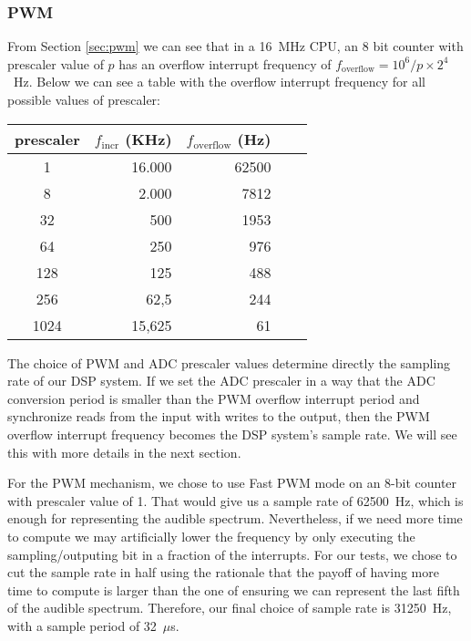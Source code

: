 

\subsubsection{PWM}
\label{sec:proc-pwm}

From Section \ref{sec:pwm} we can see that in a 16~MHz CPU, an 8 bit counter with prescaler value of $p$ has 
an overflow interrupt frequency of $f_\text{overflow}=10^6/p \times 2^4$~Hz.
Below we can see a table with the overflow interrupt frequency for all possible values of
prescaler:

\begin{center}
\begin{tabular}{crrrr}
\toprule
\toprule
\footnotesize{prescaler} &
\footnotesize{$f_\text{incr}$ (KHz)} &
\footnotesize{$f_\text{overflow}$ (Hz)}  \\
\midrule
1 & 16.000 & 62500 \\
8 & 2.000 & 7812 \\
32 & 500 & 1953 \\
64 & 250 & 976 \\
128 & 125 & 488 \\
256 & 62,5 & 244 \\
1024 & 15,625 & 61 \\
\bottomrule
\end{tabular}
\end{center}

The choice of PWM and ADC prescaler values determine directly the sampling
rate of our DSP system. If we set the ADC prescaler in a way that the ADC
conversion period is smaller than the PWM overflow interrupt period and synchronize
reads from the input with writes to the output, then
the PWM overflow interrupt frequency becomes the DSP system's sample rate. We
will see this with more details in the next section.

For the PWM mechanism, we chose to use Fast PWM mode on
an 8-bit counter with prescaler value of 1. That would give us a sample rate of
62500~Hz, which is enough for representing the audible spectrum. Nevertheless,
if we need more time to compute we may artificially lower the frequency by
only executing the sampling/outputing bit in a fraction of the interrupts. For
our tests, we chose to cut the sample rate in half using the rationale that
the payoff of having more time to compute is larger than the one of ensuring
we can represent the last fifth of the audible spectrum. Therefore, our final choice of sample rate is 31250~Hz, with a sample period
of 32~$\mu$s.

